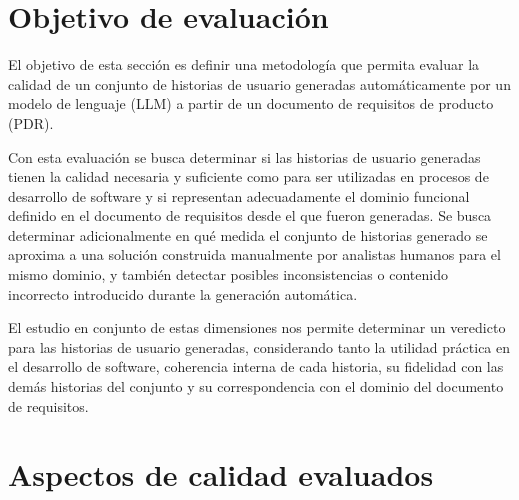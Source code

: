 \section{Objetivo de evaluación}
El objetivo de esta sección es definir una metodología que permita evaluar la calidad de un conjunto de historias de usuario generadas automáticamente por un modelo de lenguaje (LLM) a partir de un documento de requisitos de producto (PDR).

Con esta evaluación se busca determinar si las historias de usuario generadas tienen la calidad necesaria y suficiente como para ser utilizadas en procesos de desarrollo de software y si representan adecuadamente el dominio funcional definido en el documento de requisitos desde el que fueron generadas. Se busca determinar adicionalmente en qué medida el conjunto de historias generado se aproxima a una solución construida manualmente por analistas humanos para el mismo dominio, y también detectar posibles inconsistencias o contenido incorrecto introducido durante la generación automática.

El estudio en conjunto de estas dimensiones nos permite determinar un veredicto para las historias de usuario generadas, considerando tanto la utilidad práctica en el desarrollo de software, coherencia interna de cada historia, su fidelidad con las demás historias del conjunto y su correspondencia con el dominio del documento de requisitos.

\section{Aspectos de calidad evaluados}

